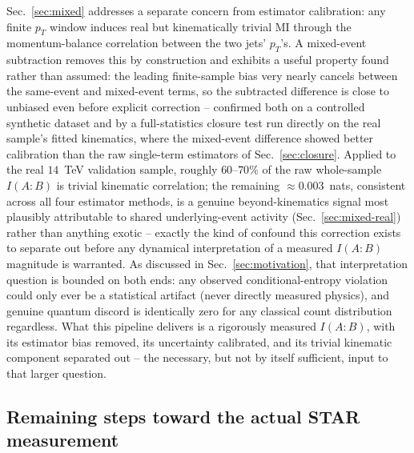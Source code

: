 \documentclass[11pt]{article}
\begin{document}
Sec.~\ref{sec:mixed} addresses a separate concern from estimator
calibration: any finite $p_T$ window induces real but kinematically
trivial MI through the momentum-balance correlation between the two
jets' $p_T$'s. A mixed-event subtraction removes this by construction
and exhibits a useful property found rather than assumed: the leading
finite-sample bias very nearly cancels between the same-event and
mixed-event terms, so the subtracted difference is close to unbiased
even before explicit correction -- confirmed both on a controlled
synthetic dataset and by a full-statistics closure test run directly on
the real sample's fitted kinematics, where the mixed-event difference
showed better calibration than the raw single-term estimators of
Sec.~\ref{sec:closure}. Applied to the real $14$~TeV validation sample,
roughly $60$--$70\%$ of the raw whole-sample $I(A{:}B)$ is trivial
kinematic correlation; the remaining $\approx0.003$~nats, consistent
across all four estimator methods, is a genuine beyond-kinematics signal
most plausibly attributable to shared underlying-event activity
(Sec.~\ref{sec:mixed-real}) rather than anything exotic -- exactly the
kind of confound this correction exists to separate out before any
dynamical interpretation of a measured $I(A{:}B)$ magnitude is
warranted. As discussed in Sec.~\ref{sec:motivation}, that interpretation
question is bounded on both ends: any observed conditional-entropy
violation could only ever be a statistical artifact (never directly
measured physics), and genuine quantum discord is identically zero for
any classical count distribution regardless. What this pipeline
delivers is a rigorously measured $I(A{:}B)$, with its estimator bias
removed, its uncertainty calibrated, and its trivial kinematic component
separated out -- the necessary, but not by itself sufficient, input to
that larger question.

\subsection{Remaining steps toward the actual STAR measurement}
\end{document}
